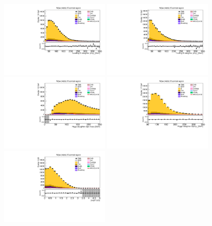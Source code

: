 \begin{figure}[tbp]
  \begin{center}
    \includegraphics[width=0.48\textwidth]{figures/wlnhbb2016/resolved/WenWH2TopCR_Hbjet1Pt.pdf}
    \includegraphics[width=0.48\textwidth]{figures/wlnhbb2016/resolved/WenWH2TopCR_Hbjet2Pt.pdf}
    \includegraphics[width=0.48\textwidth]{figures/wlnhbb2016/resolved/WenWH2TopCR_mH.pdf}
    \includegraphics[width=0.48\textwidth]{figures/wlnhbb2016/resolved/WenWH2TopCR_pTH.pdf}
    \includegraphics[width=0.48\textwidth]{figures/wlnhbb2016/resolved/WenWH2TopCR_dEtab1b2.pdf}

\end{center}
\end{figure}
